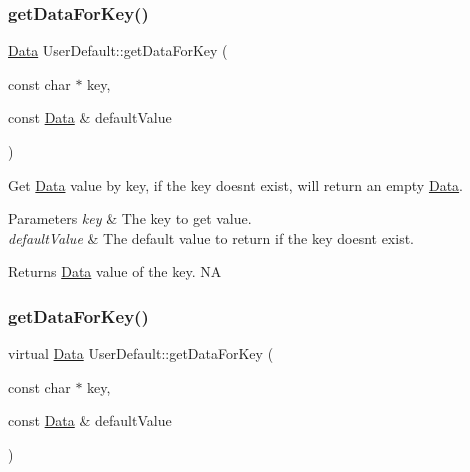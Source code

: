\subsubsection{\texorpdfstring{get\+Data\+For\+Key()}{getDataForKey()}\hspace{0.1cm}{\footnotesize\ttfamily [3/4]}}
{\footnotesize\ttfamily \hyperlink{classData}{Data} User\+Default\+::get\+Data\+For\+Key (\begin{DoxyParamCaption}\item[{const char $\ast$}]{key,  }\item[{const \hyperlink{classData}{Data} \&}]{default\+Value }\end{DoxyParamCaption})\hspace{0.3cm}{\ttfamily [virtual]}}

Get \hyperlink{classData}{Data} value by key, if the key doesn\textquotesingle{}t exist, will return an empty \hyperlink{classData}{Data}. 
\begin{DoxyParams}{Parameters}
{\em key} & The key to get value. \\
\hline
{\em default\+Value} & The default value to return if the key doesn\textquotesingle{}t exist. \\
\hline
\end{DoxyParams}
\begin{DoxyReturn}{Returns}
\hyperlink{classData}{Data} value of the key.  NA 
\end{DoxyReturn}
\mbox{\label{classUserDefault_a835cf46f90b74654728de4c1ace8ff9a}} 
\subsubsection{\texorpdfstring{get\+Data\+For\+Key()}{getDataForKey()}\hspace{0.1cm}{\footnotesize\ttfamily [4/4]}}
{\footnotesize\ttfamily virtual \hyperlink{classData}{Data} User\+Default\+::get\+Data\+For\+Key (\begin{DoxyParamCaption}\item[{const char $\ast$}]{key,  }\item[{const \hyperlink{classData}{Data} \&}]{default\+Value }\end{DoxyParamCaption})\hspace{0.3cm}{\ttfamily [virtual]}}

